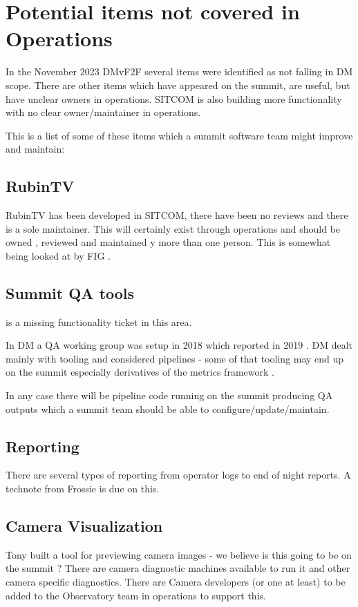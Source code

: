 \section{Potential items not covered in \gls{Operations}} \label{sec:items}

In the November 2023 DMvF2F several items were identified as not falling in \gls{DM} scope.
There are other items which have appeared on the summit, are useful, but have unclear owners in operations.
\gls{SITCOM} is also building more functionality with no clear owner/maintainer in operations.

This is a list of some of these items which a summit \gls{software} team might improve and maintain:

\subsection{ RubinTV }
 RubinTV  has been developed in \gls{SITCOM}, there have been no reviews and there is a sole maintainer.
This will certainly exist through operations and should be owned , reviewed and maintained y more than one person.
This is somewhat being looked at by FIG .

\subsection{ Summit \gls{QA} tools}
 is a missing functionality ticket in this area.

In DM a \gls{QA} working group was setup in 2018  which reported in 2019 .
DM dealt mainly with tooling and considered pipelines - some of that tooling may end up on the summit especially derivatives of the metrics framework .

In any case there will be pipeline code running on the summit producing QA outputs which a summit team should be able to configure/update/maintain.



\subsection{ Reporting }

There are several types of reporting from operator logs to end of night reports.
A technote from Frossie is due on this.

\subsection{ \gls{Camera} Visualization}
Tony built a tool for previewing camera images - we believe is this going to be on the summit ?
There are camera diagnostic machines available to run it and other camera specific diagnostics.
There are Camera developers (or one at least) to be added to the Observatory team in operations to support this.

